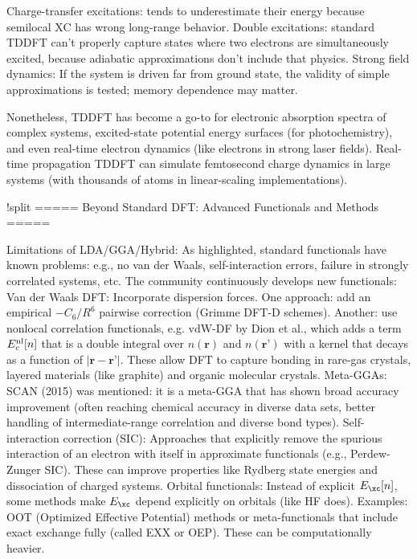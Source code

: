 Charge-transfer excitations: tends to underestimate their energy
because semilocal XC has wrong long-range behavior.  Double
excitations: standard TDDFT can’t properly capture states where two
electrons are simultaneously excited, because adiabatic approximations
don’t include that physics.  Strong field dynamics: If the system is
driven far from ground state, the validity of simple approximations is
tested; memory dependence may matter.

Nonetheless, TDDFT has become a go-to for electronic absorption
spectra of complex systems, excited-state potential energy surfaces
(for photochemistry), and even real-time electron dynamics (like
electrons in strong laser fields). Real-time propagation TDDFT can
simulate femtosecond charge dynamics in large systems (with thousands
of atoms in linear-scaling implementations). 

!split
===== Beyond Standard DFT: Advanced Functionals and Methods =====

Limitations of LDA/GGA/Hybrid: As highlighted, standard functionals
have known problems: e.g., no van der Waals, self-interaction errors,
failure in strongly correlated systems, etc. The community
continuously develops new functionals:  Van der Waals DFT: Incorporate
dispersion forces. One approach: add an empirical $-C_6/R^6$ pairwise
correction (Grimme DFT-D schemes). Another: use nonlocal correlation
functionals, e.g. vdW-DF by Dion et al., which adds a term $E_c^{\rm
  nl}[n]$ that is a double integral over $n(\mathbf{r})$ and
$n(\mathbf{r’})$ with a kernel that decays as a function of
$|\mathbf{r}-\mathbf{r’}|$. These allow DFT to capture bonding in
rare-gas crystals, layered materials (like graphite) and organic
molecular crystals.  Meta-GGAs: SCAN (2015) was mentioned: it is a
meta-GGA that has shown broad accuracy improvement (often reaching
chemical accuracy in diverse data sets, better handling of
intermediate-range correlation and diverse bond types).
Self-interaction correction (SIC): Approaches that explicitly remove
the spurious interaction of an electron with itself in approximate
functionals (e.g., Perdew-Zunger SIC). These can improve properties
like Rydberg state energies and dissociation of charged systems.
Orbital functionals: Instead of explicit $E_{\xc}[n]$, some methods
make $E_{\xc}$ depend explicitly on orbitals (like HF does). Examples:
OOT (Optimized Effective Potential) methods or meta-functionals that
include exact exchange fully (called EXX or OEP). These can be
computationally heavier.


